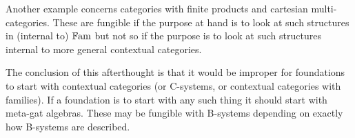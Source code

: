 \note Another example concerns categories with finite products and cartesian multi-categories. These are fungible if the purpose at hand is to look at such structures in (internal to) $\mathbb{F\mathrm{am}} $ but
not so if the purpose is to look at such structures internal to  more general contextual categories. 

\note The conclusion of this afterthought is that it would be improper for foundations to start with contextual categories
(or C-systems, or contextual categories with families). If a foundation is to start with any such thing it should start with 
meta-gat algebras. These may be fungible with  B-systems depending on exactly how B-systems are described.


